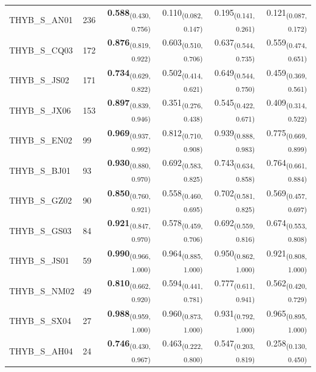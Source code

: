 \begin{table}[p]
\begin{tabular}{llrrrr}
THYB\_S\_AN01 & 236 & \textbf{0.588}\textsubscript{(0.430, 0.756)} & 0.110\textsubscript{(0.082, 0.147)} & 0.195\textsubscript{(0.141, 0.261)} & 0.121\textsubscript{(0.087, 0.172)} \\
THYB\_S\_CQ03 & 172 & \textbf{0.876}\textsubscript{(0.819, 0.922)} & 0.603\textsubscript{(0.510, 0.706)} & 0.637\textsubscript{(0.544, 0.735)} & 0.559\textsubscript{(0.474, 0.651)} \\
THYB\_S\_JS02 & 171 & \textbf{0.734}\textsubscript{(0.629, 0.822)} & 0.502\textsubscript{(0.414, 0.621)} & 0.649\textsubscript{(0.544, 0.750)} & 0.459\textsubscript{(0.369, 0.561)} \\
THYB\_S\_JX06 & 153 & \textbf{0.897}\textsubscript{(0.839, 0.946)} & 0.351\textsubscript{(0.276, 0.438)} & 0.545\textsubscript{(0.422, 0.671)} & 0.409\textsubscript{(0.314, 0.522)} \\
THYB\_S\_EN02 & 99 & \textbf{0.969}\textsubscript{(0.937, 0.992)} & 0.812\textsubscript{(0.710, 0.908)} & 0.939\textsubscript{(0.888, 0.983)} & 0.775\textsubscript{(0.669, 0.899)} \\
THYB\_S\_BJ01 & 93 & \textbf{0.930}\textsubscript{(0.880, 0.970)} & 0.692\textsubscript{(0.583, 0.825)} & 0.743\textsubscript{(0.634, 0.858)} & 0.764\textsubscript{(0.661, 0.884)} \\
THYB\_S\_GZ02 & 90 & \textbf{0.850}\textsubscript{(0.760, 0.921)} & 0.558\textsubscript{(0.460, 0.695)} & 0.702\textsubscript{(0.581, 0.825)} & 0.569\textsubscript{(0.457, 0.697)} \\
THYB\_S\_GS03 & 84 & \textbf{0.921}\textsubscript{(0.847, 0.970)} & 0.578\textsubscript{(0.459, 0.706)} & 0.692\textsubscript{(0.559, 0.816)} & 0.674\textsubscript{(0.553, 0.808)} \\
THYB\_S\_JS01 & 59 & \textbf{0.990}\textsubscript{(0.966, 1.000)} & 0.964\textsubscript{(0.885, 1.000)} & 0.950\textsubscript{(0.862, 1.000)} & 0.921\textsubscript{(0.808, 1.000)} \\
THYB\_S\_NM02 & 49 & \textbf{0.810}\textsubscript{(0.662, 0.920)} & 0.594\textsubscript{(0.441, 0.781)} & 0.777\textsubscript{(0.611, 0.941)} & 0.562\textsubscript{(0.420, 0.729)} \\
THYB\_S\_SX04 & 27 & \textbf{0.988}\textsubscript{(0.959, 1.000)} & 0.960\textsubscript{(0.873, 1.000)} & 0.931\textsubscript{(0.792, 1.000)} & 0.965\textsubscript{(0.895, 1.000)} \\
THYB\_S\_AH04 & 24 & \textbf{0.746}\textsubscript{(0.430, 0.967)} & 0.463\textsubscript{(0.222, 0.800)} & 0.547\textsubscript{(0.203, 0.819)} & 0.258\textsubscript{(0.130, 0.450)} \\

\end{tabular}
\end{table}
